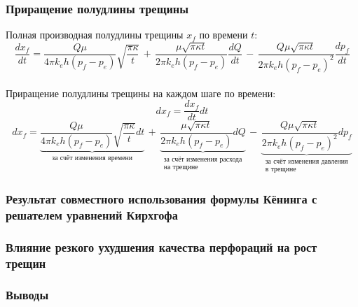 \documentclass{beamer}
\begin{document}
\begin{frame}
\frametitle{Приращение полудлины трещины}

Полная производная полудлины трещины $x_{\!f}$ по времени $t$:
\small
$$
\frac{dx_{\!f}}{dt}=\frac{Q\mu}{4\pi k_eh\left(p_{\!f}-p_e\right)}\sqrt{\frac{\pi\kappa}{t}}\,+\,\frac{\mu\sqrt{\pi\kappa t}}{2\pi k_eh\left(p_{\!f}-p_e\right)}\frac{dQ}{dt}\,-\,\frac{Q\mu\sqrt{\pi\kappa t}}{2\pi k_eh\left(p_{\!f}-p_e\right)^2}\frac{dp_{\!f}}{dt}
$$
\normalsize
\ \\

Приращение полудлины трещины на каждом шаге по времени:
$$
dx_{\!f}=\frac{dx_{\!f}}{dt}dt
$$
\small
$$
dx_{\!f}=\underbrace{\frac{Q\mu}{4\pi k_eh\left(p_{\!f}-p_e\right)}\sqrt{\frac{\pi\kappa}{t}}dt}_{\text{за счёт изменения времени}}\,+\,\underbrace{\frac{\mu\sqrt{\pi\kappa t}}{2\pi k_eh\left(p_{\!f}-p_e\right)}dQ}_{\substack{\text{за счёт изменения расхода}\\\text{на трещине}}}\,-\,\underbrace{\frac{Q\mu\sqrt{\pi\kappa t}}{2\pi k_eh\left(p_{\!f}-p_e\right)^2}dp_{\!f}}_{\substack{\text{за счёт изменения давления}\\\text{в трещине}}}
$$
\normalsize

\end{frame}


\begin{frame}
\frametitle{Результат совместного использования формулы Кёнинга с решателем уравнений Кирхгофа}


\end{frame}

\begin{frame}
\frametitle{Влияние резкого ухудшения качества перфораций на рост трещин}

\end{frame}

\begin{frame}
\frametitle{Выводы}

\end{frame}
\end{document}
